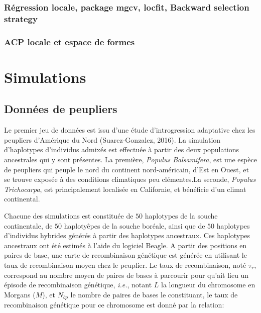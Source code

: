 \documentclass[12pt,a4paper,twoside]{ugathesis}
\theoremstyle{definition}
\theoremstyle{definition}
\theoremstyle{remark}
\begin{document}
\subsubsection{Régression locale, package mgcv, locfit, Backward
selection
strategy}\label{regression-locale-package-mgcv-locfit-backward-selection-strategy}

\subsubsection{ACP locale et espace de
formes}\label{acp-locale-et-espace-de-formes}

\newpage

\section{Simulations}\label{simulations}

\subsection{Données de peupliers}\label{donnees-de-peupliers}

Le premier jeu de données est issu d'une étude d'introgression
adaptative chez les peupliers d'Amérique du Nord (Suarez-Gonzalez,
2016). La simulation d'haplotypes d'individus admixés est effectuée à
partir des deux populations ancestrales qui y sont présentes. La
première, \emph{Populus Balsamifera}, est une espèce de peupliers qui
peuple le nord du continent nord-américain, d'Est en Ouest, et se trouve
exposée à des conditions climatiques peu clémentes.La seconde,
\emph{Populus Trichocarpa}, est principalement localisée en Californie,
et bénéficie d'un climat continental.

Chacune des simulations est constituée de \(50\) haplotypes de la souche
continentale, de \(50\) haplotyêpes de la souche boréale, ainsi que de
\(50\) haplotypes d'individus hybrides générés à partir des haplotypes
ancestraux. Ces haplotypes ancestraux ont été estimés à l'aide du
logiciel Beagle. A partir des positions en paires de base, une carte de
recombinaison génétique est générée en utilisant le taux de
recombinaison moyen chez le peuplier. Le taux de recombinaison, noté
\(\tau_r\), correspond au nombre moyen de paires de bases à parcourir
pour qu'ait lieu un épisode de recombinaison génétique, \emph{i.e.},
notant \(L\) la longueur du chromosome en Morgans (\(M\)), et \(N_{bp}\)
le nombre de paires de bases le constituant, le taux de recombinaison
génétique pour ce chromosome est donné par la relation:
\end{document}
